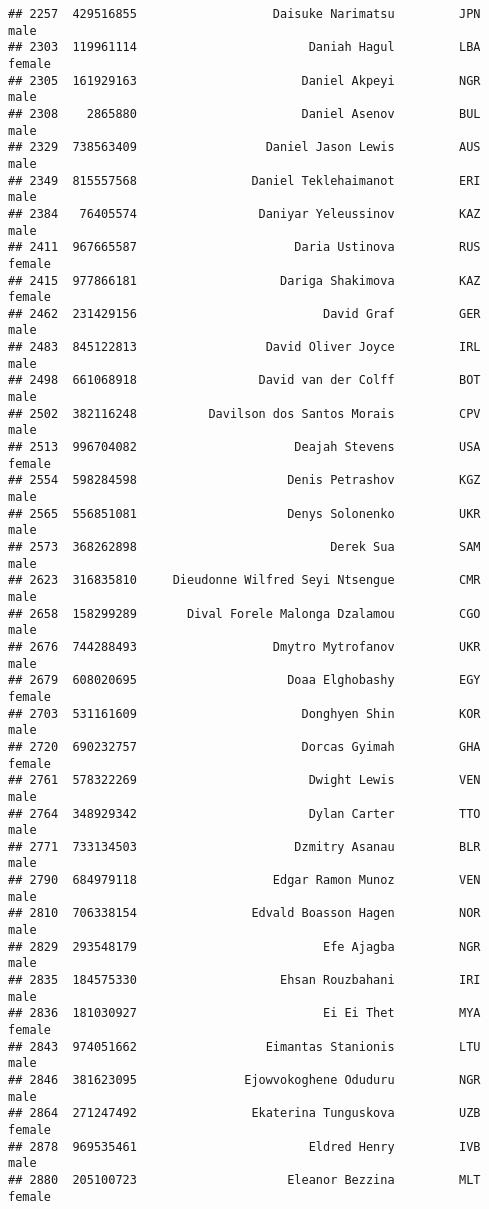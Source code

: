 \documentclass[]{article}
\begin{document}
\begin{verbatim}
## 2257  429516855                   Daisuke Narimatsu         JPN   male
## 2303  119961114                        Daniah Hagul         LBA female
## 2305  161929163                       Daniel Akpeyi         NGR   male
## 2308    2865880                       Daniel Asenov         BUL   male
## 2329  738563409                  Daniel Jason Lewis         AUS   male
## 2349  815557568                Daniel Teklehaimanot         ERI   male
## 2384   76405574                 Daniyar Yeleussinov         KAZ   male
## 2411  967665587                      Daria Ustinova         RUS female
## 2415  977866181                    Dariga Shakimova         KAZ female
## 2462  231429156                          David Graf         GER   male
## 2483  845122813                  David Oliver Joyce         IRL   male
## 2498  661068918                 David van der Colff         BOT   male
## 2502  382116248          Davilson dos Santos Morais         CPV   male
## 2513  996704082                      Deajah Stevens         USA female
## 2554  598284598                     Denis Petrashov         KGZ   male
## 2565  556851081                     Denys Solonenko         UKR   male
## 2573  368262898                           Derek Sua         SAM   male
## 2623  316835810     Dieudonne Wilfred Seyi Ntsengue         CMR   male
## 2658  158299289       Dival Forele Malonga Dzalamou         CGO   male
## 2676  744288493                   Dmytro Mytrofanov         UKR   male
## 2679  608020695                     Doaa Elghobashy         EGY female
## 2703  531161609                       Donghyen Shin         KOR   male
## 2720  690232757                       Dorcas Gyimah         GHA female
## 2761  578322269                        Dwight Lewis         VEN   male
## 2764  348929342                        Dylan Carter         TTO   male
## 2771  733134503                      Dzmitry Asanau         BLR   male
## 2790  684979118                   Edgar Ramon Munoz         VEN   male
## 2810  706338154                Edvald Boasson Hagen         NOR   male
## 2829  293548179                          Efe Ajagba         NGR   male
## 2835  184575330                    Ehsan Rouzbahani         IRI   male
## 2836  181030927                          Ei Ei Thet         MYA female
## 2843  974051662                  Eimantas Stanionis         LTU   male
## 2846  381623095               Ejowvokoghene Oduduru         NGR   male
## 2864  271247492                Ekaterina Tunguskova         UZB female
## 2878  969535461                        Eldred Henry         IVB   male
## 2880  205100723                     Eleanor Bezzina         MLT female

\end{verbatim}
\end{document}
